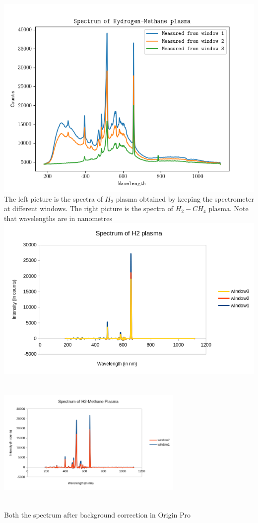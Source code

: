 \documentclass[]{report}[12 pt]
\begin{document}
\begin{center}
		\includegraphics[width=9.2 cm]{h2me.png}\\
		The left picture is the spectra of $H_2$ plasma obtained by keeping the spectrometer at different windows. The right picture is the spectra of $H_2-CH_4$ plasma. Note that wavelengths are in nanometres\\
			\includegraphics[width=9 cm,height=7 cm]{h2ex.png}
		\includegraphics[width=9cm,height=7cm]{h2meex.png}\\
			Both the spectrum after background correction in Origin Pro\\

\end{center}
\end{document}
